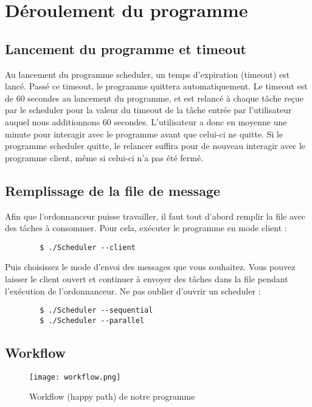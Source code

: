 \chapter{Déroulement du programme}

    \section{Lancement du programme et timeout}
    
    Au lancement du programme scheduler, un temps d'expiration (timeout) est lancé. Passé ce timeout, le programme quittera automatiquement. Le timeout est de 60 secondes au lancement du programme, et est relancé à chaque tâche reçue par le scheduler pour la valeur du timeout de la tâche entrée par l'utilisateur auquel nous additionnons 60 secondes. L'utilisateur a donc en moyenne une minute pour interagir avec le programme avant que celui-ci ne quitte.
    Si le programme scheduler quitte, le relancer suffira pour de nouveau interagir avec le programme client, même si celui-ci n'a pas été fermé.

    \section{Remplissage de la file de message}
    
    Afin que l'ordonnanceur puisse travailler, il faut tout d'abord remplir la file avec des tâches à consommer. Pour cela, exécuter le programme en mode client :
    
    \begin{verbatim}
        $ ./Scheduler --client
    \end{verbatim}
    
    Puis choisissez le mode d'envoi des messages que vous souhaitez. Vous pouvez laisser le client ouvert et continuer à envoyer des tâches dans la file pendant l'exécution de l'ordonnanceur. Ne pas oublier d'ouvrir un scheduler :
    
    \begin{verbatim}
        $ ./Scheduler --sequential
        $ ./Scheduler --parallel
    \end{verbatim}

    

    \section{Workflow}
    
    \vfill
    \begin{figure}[!b]
        \centerline {\texttt{[image: workflow.png]}}
        \caption{Workflow (happy path) de notre programme}
        \label{Workflow (happy path) de notre programme}
    \end{figure}